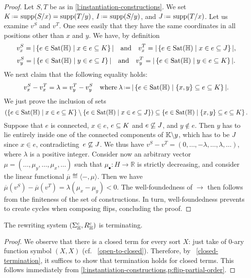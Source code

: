\begin{proof}
Let $S,T$ be as in \cref{l:instantiation-constructions}. 
We set $K\eqdef \supp(\occ{S}{x})=\supp(\occ{T}{y})$, $I\eqdef \supp(\occ{S}{y})$, and $J\eqdef \supp(\occ{T}{x})$.
Let us examine $v^S$ and $v^T$. 
One sees easily that they have the same coordinates in all positions other than $x$ and $y$. 
We have, by definition
$$ v^S_x  = |\left\{e\in{\operatorname{Sat}}({\mathbb H}) \mid x\in e\subseteq K\right\}| \quad \text{and} \quad v^T_x  = |\left\{e\in{\operatorname{Sat}}({\mathbb H}) \mid x\in e\subseteq J\right\}|, $$
$$ v^S_y  = |\left\{e\in{\operatorname{Sat}}({\mathbb H}) \mid y\in e\subseteq I\right\}| \quad \text{and} \quad v^T_y  = |\left\{e\in{\operatorname{Sat}}({\mathbb H}) \mid y\in e\subseteq K\right\}|.$$
We next claim that the following equality holds:
$$v^S_x  - v^T_x  = \lambda = 
v^T_y - v^S_y \quad\textrm{where}\: \lambda\eqdef  |\setc{e\in{\Sat}(\hyper{H})}{\set{x,y}\inc e\inc K}|.$$
We just prove the inclusion of sets
$$\left(\left\{e\in{\operatorname{Sat}}({\mathbb H}) \mid x\in e\subseteq K\right\}\setminus\left\{e\in{\operatorname{Sat}}({\mathbb H}) \mid x\in e\subseteq J\right\}\right)
\subseteq\left\{e\in{\operatorname{Sat}}({\mathbb H}) \mid \left\{x,y\right\}\subseteq e\subseteq K\right\}.$$
Suppose that $e$ is connected, $x\in e$, $e\subseteq K$ and $e\not\subseteq J$, and $y\not\in e$. Then $y$ has to lie entirely inside one of the connected components of ${\mathbb K}\backslash y$, which has to be $J$ since $x\in e$, contradicting~$e\not\subseteq J$.
We thus have
$v^S - v^T = (0,\ldots,-\lambda,\ldots,\lambda,\ldots)$, where $\lambda$ is a positive integer.
Consider now an arbitrary vector $\mu=(\ldots,\mu_y,\ldots,\mu_x,\ldots)$ such that $\mu_{\bullet}:H\rightarrow\mathbb{R}$ is strictly decreasing, and consider the linear functional $\overline{\mu}\eqdef \langle -,\mu\rangle$. 
Then we have 
$\overline{\mu}(v^S)- \overline{\mu}(v^T)=\lambda(\mu_x-\mu_y)<0$.  The well-foundedness of $\to$ then follows from the finiteness of the set of constructions. In turn, well-foundedness 
prevents to create cycles when composing flips, concluding the proof.
\end{proof}


\begin{samepage}
  \begin{thm}
    \label{thm:termination}
    The rewriting system $(\Sigma_{\mathbb H}^c,R_{\mathbb H}^c)$ is terminating.
  \end{thm}
  
  \begin{proof} 
    We observe that there is a closed term for every sort $X$: just take of 0-ary function symbol $(X,X)$ (cf.~ \cref{open-to-closed}). 
    Therefore, by~ \cref{closed-termination}, it suffices to show that termination holds for closed terms. 
    This follows immediately from \cref{l:instantiation-constructions,p:flip-partial-order}.
  \end{proof}
\end{samepage}


